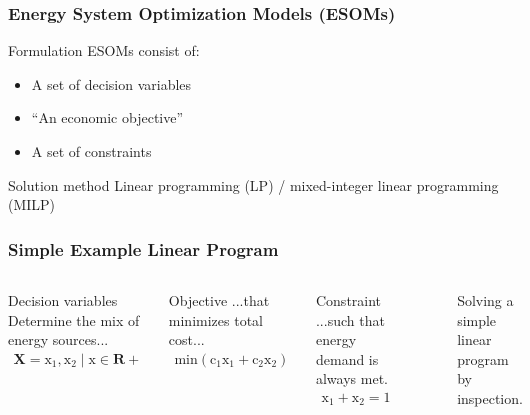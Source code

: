 \begin{frame}
    \frametitle{Energy System Optimization Models (ESOMs)}
    
    \begin{block}{Formulation}
        ESOMs consist of:
        \begin{itemize}
            \item A set of decision variables
            \item ``An economic objective'' \cite{hobbs_optimization_1995}
            \item A set of constraints
        \end{itemize}
    \end{block}
    \begin{block}{Solution method}
        Linear programming (LP) / mixed-integer linear programming (MILP)
    \end{block}

\end{frame}

\begin{frame}
    \frametitle{Simple Example Linear Program}
    
    \begin{columns}
        \column[t]{4cm}
        \begin{block}{Decision variables}
            Determine the mix of energy sources...
            \begin{align}
                \mathbf{X} = {\mathrm{x}_1, \mathrm{x}_2 \mid \mathrm{x} \in \mathbf{R}+}
            \end{align}
        \end{block}
        \begin{block}{Objective}
            ...that minimizes total cost...
            \begin{align}
                \mathrm{min}\left(\mathrm{c}_1\mathrm{x}_1 + \mathrm{c}_2\mathrm{x}_2\right)
            \end{align}
        \end{block}
        \begin{block}{Constraint}
            ...such that energy demand is always met.
            \begin{align}
                \mathrm{x}_1 + \mathrm{x}_2 = 1
            \end{align}
        \end{block}
        \column[t]{6cm}
        \begin{figure}
            \centering
            \resizebox{\columnwidth}{!}{}
            \caption{Solving a simple linear program by inspection.}
            \label{fig:simple-lp}
        \end{figure}

    \end{columns}

\end{frame}


